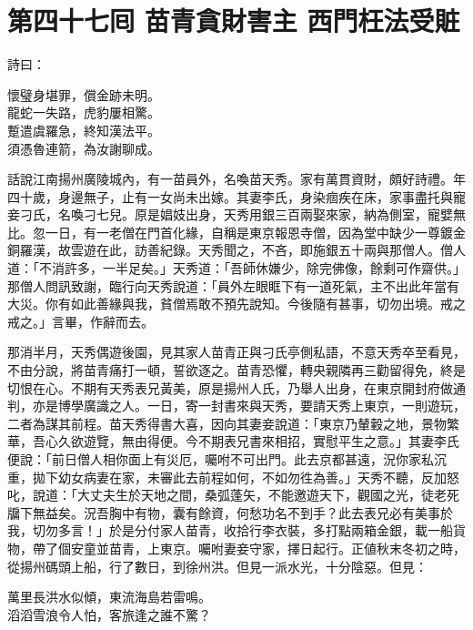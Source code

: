 
\chapter*{第四十七囘 苗青貪財害主 西門枉法受賍}


詩曰：

\begin{myquote}
懷璧身堪罪，償金跡未明。\\龍蛇一失路，虎豹屢相驚。\\蹔遣虞羅急，終知漢法平。\\須憑魯連箭，為汝謝聊成。
\end{myquote}

話說江南揚州廣陵城內，有一苗員外，名喚苗天秀。家有萬貫資財，頗好詩禮。年四十歲，身邊無子，止有一女尚未出嫁。其妻李氏，身染痼疾在床，家事盡托與寵妾刁氏，名喚刁七兒。原是娼妓出身，天秀用銀三百兩娶來家，納為側室，寵嬖無比。{}忽一日，有一老僧在門首化緣，自稱是東京報恩寺僧，因為堂中缺少一尊鍍金銅羅漢，故雲遊在此，訪善紀錄。天秀聞之，不吝，即施銀五十兩與那僧人。僧人道：「不消許多，一半足矣。」天秀道：「吾師休嫌少，除完佛像，餘剩可作齋供。」那僧人問訊致謝，臨行向天秀說道：「員外左眼眶下有一道死氣，主不出此年當有大災。你有如此善緣與我，貧僧焉敢不預先說知。今後隨有甚事，切勿出境。戒之戒之。」言畢，作辭而去。

那消半月，天秀偶遊後園，見其家人苗青正與刁氏亭側私語，不意天秀卒至看見，不由分說，將苗青痛打一頓，誓欲逐之。苗青恐懼，轉央親隣再三勸留得免，終是切恨在心。不期有天秀表兄黃美，原是揚州人氏，乃舉人出身，在東京開封府做通判，亦是博學廣識之人。一日，寄一封書來與天秀，要請天秀上東京，一則遊玩，二者為謀其前程。苗天秀得書大喜，因向其妻妾說道：「東京乃輦轂之地，景物繁華，吾心久欲遊覽，無由得便。今不期表兄書來相招，實慰平生之意。」其妻李氏便說：「前日僧人相你面上有災厄，囑咐不可出門。此去京都甚遠，況你家私沉重，拋下幼女病妻在家，未審此去前程如何，不如勿徃為善。」天秀不聽，反加怒叱，說道：「大丈夫生於天地之間，桑弧蓬矢，不能邀遊天下，觀國之光，徒老死牖下無益矣。況吾胸中有物，囊有餘資，何愁功名不到手？此去表兄必有美事於我，切勿多言！」於是分付家人苗青，收拾行李衣裝，多打點兩箱金銀，載一船貨物，帶了個安童並苗青，上東京。囑咐妻妾守家，擇日起行。正値秋末冬初之時，從揚州碼頭上船，行了數日，到徐州洪。但見一派水光，十分陰惡。但見：

\begin{myquote}
萬里長洪水似傾，東流海島若雷鳴。\\滔滔雪浪令人怕，客旅逢之誰不驚？
\end{myquote}

